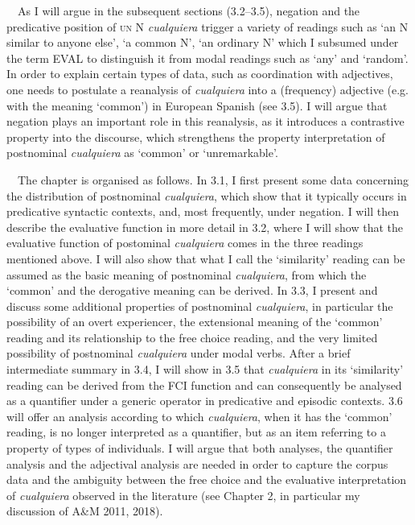 \begin{styleStandard}
\ \ As I will argue in the subsequent sections (3.2–3.5), negation and the predicative position of \textsc{un} N \textit{cualquiera} trigger a variety of readings such as ‘an N similar to anyone else’, ‘a common N’, ‘an ordinary N’ which I subsumed under the term EVAL to distinguish it from modal readings such as ‘any’ and ‘random’. In order to explain certain types of data, such as coordination with adjectives, one needs to postulate a reanalysis of \textit{cualquiera} into a (frequency) adjective (e.g. with the meaning ‘common’) in European Spanish (see 3.5). I will argue that negation plays an important role in this reanalysis, as it introduces a contrastive property into the discourse, which strengthens the property interpretation of postnominal \textit{cualquiera} as ‘common’ or ‘unremarkable’.
\end{styleStandard}

\begin{styleStandard}
\ \ The chapter is organised as follows. In 3.1, I first present some data concerning the distribution of postnominal \textit{cualquiera}, which show that it typically occurs in predicative syntactic contexts, and, most frequently, under negation. I will then describe the evaluative function in more detail in 3.2, where I will show that the evaluative function of postominal \textit{cualquiera} comes in the three readings mentioned above. I will also show that what I call the ‘similarity’ reading can be assumed as the basic meaning of postnominal \textit{cualquiera}, from which the ‘common’ and the derogative meaning can be derived. In 3.3, I present and discuss some additional properties of postnominal \textit{cualquiera}, in particular the possibility of an overt experiencer, the extensional meaning of the ‘common’ reading and its relationship to the free choice reading, and the very limited possibility of postnominal \textit{cualquiera} under modal verbs. After a brief intermediate summary in 3.4, I will show in 3.5 that \textit{cualquiera} in its ‘similarity’ reading can be derived from the FCI function and can consequently be analysed as a quantifier under a generic operator in predicative and episodic contexts. 3.6 will offer an analysis according to which \textit{cualquiera}, when it has the ‘common’ reading, is no longer interpreted as a quantifier, but as an item referring to a property of types of individuals. I will argue that both analyses, the quantifier analysis and the adjectival analysis are needed in order to capture the corpus data and the ambiguity between the free choice and the evaluative interpretation of \textit{cualquiera} observed in the literature (see Chapter 2, in particular my discussion of A\&M 2011, 2018).
\end{styleStandard}

